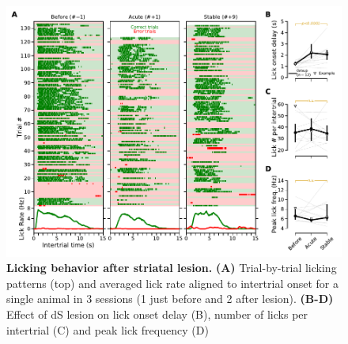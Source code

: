 \begin{figure}[tbh!]
  \begin{center}
    \includegraphics[width=\textwidth]{ch-lesion/figures/Lick.pdf}
    \caption[Licking Behavior After Striatal Lesion]
    {\textbf{Licking behavior after striatal lesion.}
	\textbf{(A)} Trial-by-trial licking patterns (top) and averaged lick rate aligned to intertrial onset for a single animal in 3 sessions (1 just before and 2 after lesion). 
	\textbf{(B-D)} Effect of dS lesion on lick onset delay (B), number of licks per intertrial (C) and peak lick frequency (D)
	}
	\label{fig:lesion:lick}
  \end{center}
\end{figure}